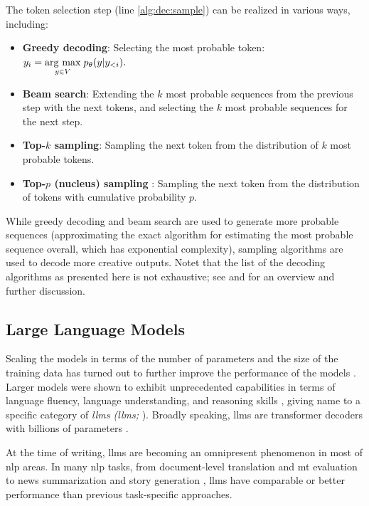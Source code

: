 {\noindent The token selection step (line \ref{alg:dec:sample}) can be realized in various ways, including:
\begin{itemize}
    \item \textbf{Greedy decoding}: Selecting the most probable token: $y_i = \underset{y \in V}{\operatorname{arg}\,\operatorname{max}}\; p_\theta(y|y_{<i}).$
    \item \textbf{Beam search}: Extending the $k$ most probable sequences from the previous step with the next tokens, and selecting the $k$ most probable sequences for the next step.
    \item \textbf{Top-$k$ sampling}: Sampling the next token from the distribution of $k$ most probable tokens.
    \item \textbf{Top-$p$ (nucleus) sampling} \cite{holtzman2019curious}: Sampling the next token from the distribution of tokens with cumulative probability $p$.
\end{itemize}
While greedy decoding and beam search are used to generate more probable sequences (approximating the exact algorithm for estimating the most probable sequence overall, which has exponential complexity), sampling algorithms are used to decode more creative outputs. Notet that the list of the decoding algorithms as presented here is not exhaustive; see \citet{zarriess2021decoding} and \citet{wiher2022decoding} for an overview and further discussion.

\subsection{Large Language Models}
\label{sec:llms}
Scaling the models in terms of the number of parameters and the size of the training data has turned out to further improve the performance of the models \cite{kaplan2020scaling,hoffmann2022training}. Larger models were shown to exhibit unprecedented capabilities in terms of language fluency, language understanding, and reasoning skills \cite{wei2022emergent,bubeck2023sparks}, giving name to a specific category of \emph{\aclp{llm} (\acsp{llm};} \citealp{brown2020language,zhao2023survey}). Broadly speaking, \acp{llm} are transformer decoders with billions of parameters \cite{yang2024harnessing}.

At the time of writing, \acp{llm} are becoming an omnipresent phenomenon in most of \ac{nlp} areas. In many \ac{nlp} tasks, from document-level translation \cite{wang2023documentlevel} and \ac{mt} evaluation \cite{kocmiLargeLanguageModels2023} to news summarization \cite{zhang2024benchmarking} and story generation \cite{xie2023next}, \acp{llm} have comparable or better performance than previous task-specific approaches.

}
